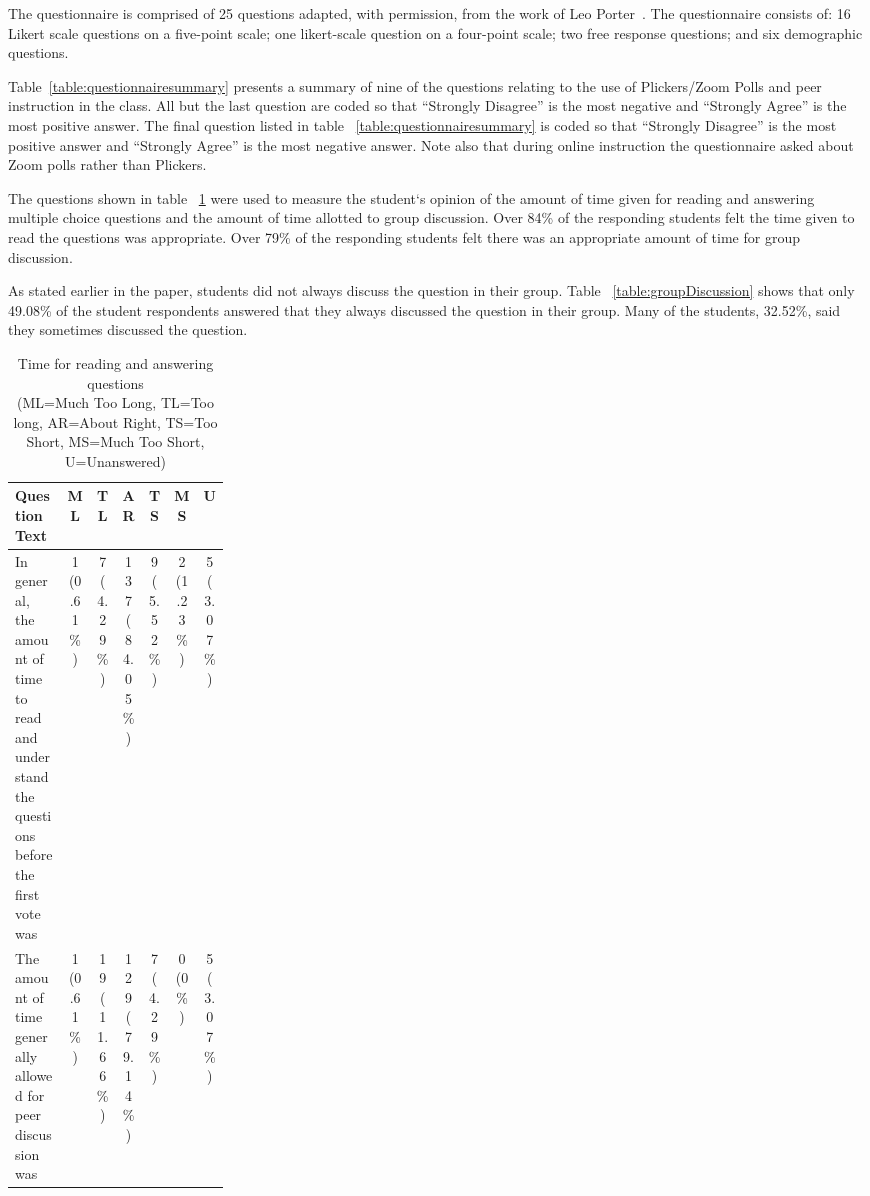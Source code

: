 \documentclass[12pt]{article}
\begin{document}
The questionnaire is comprised of 25 questions adapted, with permission, from the work of Leo Porter~\cite{porterPeerInstructionStudents2011}. The questionnaire consists of: 16 Likert scale questions on a five-point scale; one likert-scale question on a four-point scale;  two free response questions; and six demographic questions. 

Table~\ref{table:questionnairesummary} presents a summary of nine of the questions relating to the use of Plickers/Zoom Polls and peer instruction in the class. All but the last question are coded so that ``Strongly Disagree'' is the most negative and ``Strongly Agree'' is the most positive answer. The final question listed in table ~\ref{table:questionnairesummary} is coded so that ``Strongly Disagree'' is the most positive answer and ``Strongly Agree'' is the most negative answer. Note also that during online instruction the questionnaire asked about Zoom polls rather than Plickers.

The questions shown in table ~\ref{table:timeForQuestions} were used to measure the student`s opinion of the amount of time given for reading and answering multiple choice questions and the amount of time allotted to group discussion. Over 84\% of the responding students felt the time given to read the questions was appropriate. Over 79\% of the responding students felt there was an appropriate amount of time for group discussion. 

As stated earlier in the paper, students did not always discuss the question in their group. Table ~\ref{table:groupDiscussion} shows that only 49.08\% of the student respondents answered that they always discussed the question in their group. Many of the students, 32.52\%, said they sometimes discussed the question. 


\begin{table}[ht]
\caption{Time for reading and answering questions\\\hspace{\textwidth} (ML=Much Too Long, TL=Too long, AR=About Right, TS=Too Short, MS=Much Too Short, U=Unanswered)}
\begin{tabular}{p{0.25\linewidth} |c|c|c|c|c|c} %
\toprule
Question Text & ML & TL & AR & TS & MS & U \\ \midrule
\rowcolor{LightGray}%
In general, the amount of time to read and understand the questions before the first vote was & 1 (0.61\%) & 7 (4.29\%) & 137 (84.05\%) & 9 (5.52\%) & 2 (1.23\%) & 5 (3.07\%) \\ \midrule %
The amount of time generally allowed for peer discussion was & 1 (0.61\%) & 19 (11.66\%) & 129 (79.14\%) & 7 (4.29\%) & 0 (0\%) & 5 (3.07\%) \\ \bottomrule
\end{tabular}
\label{table:timeForQuestions}
\end{table}
\end{document}
